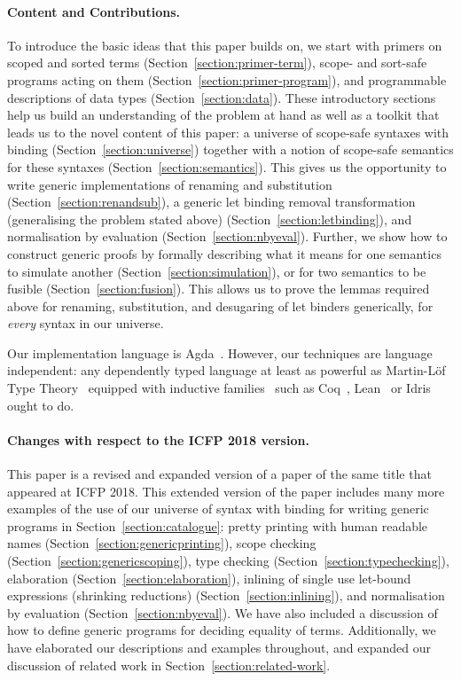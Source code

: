 \paragraph{Content and Contributions.}
To introduce the basic ideas that this paper builds on, we start with
primers on scoped and sorted terms
(Section~\ref{section:primer-term}), scope- and sort-safe programs
acting on them (Section~\ref{section:primer-program}), and
programmable descriptions of data types (Section~\ref{section:data}).
These introductory sections help us build an understanding of the
problem at hand as well as a toolkit that leads us to the novel
content of this paper: a universe of scope-safe syntaxes with binding
(Section~\ref{section:universe}) together with a notion of scope-safe
semantics for these syntaxes (Section~\ref{section:semantics}).  This
gives us the opportunity to write generic implementations of renaming
and substitution (Section~\ref{section:renandsub}), a generic
let binding removal transformation (generalising the problem stated
above) (Section~\ref{section:letbinding}), and normalisation by
evaluation (Section~\ref{section:nbyeval}). Further, we show how to
construct generic proofs by formally describing what it means for one
semantics to simulate another (Section~\ref{section:simulation}), or
for two semantics to be fusible (Section~\ref{section:fusion}). This
allows us to prove the lemmas required above for renaming,
substitution, and desugaring of let binders generically, for
\emph{every} syntax in our universe.

\medskip

Our implementation language is
Agda~\cite{norell2009dependently}. However, our techniques are
language independent: any dependently typed language at least as
powerful as Martin-L\"of Type Theory~\cite{martin1982constructive}
equipped with inductive families~\cite{dybjer1994inductive} such as
Coq~\cite{Coq:manual}, Lean~\cite{DBLP:conf/cade/MouraKADR15} or
Idris~\cite{brady2013idris} ought to do.

\medskip

\paragraph{Changes with respect to the ICFP 2018 version.} This paper
is a revised and expanded version of a paper of the same title that
appeared at ICFP 2018. This extended version of the paper includes
many more examples of the use of our universe of syntax with binding
for writing generic programs in Section~\ref{section:catalogue}:
pretty printing with human readable names
(Section~\ref{section:genericprinting}), scope checking
(Section~\ref{section:genericscoping}), type checking
(Section~\ref{section:typechecking}), elaboration
(Section~\ref{section:elaboration}), inlining of single use let-bound
expressions (shrinking reductions) (Section~\ref{section:inlining}),
and normalisation by evaluation (Section~\ref{section:nbyeval}). We
have also included a discussion of how to define generic programs for
deciding equality of terms. Additionally, we have elaborated our
descriptions and examples throughout, and expanded our discussion of
related work in Section~\ref{section:related-work}.

